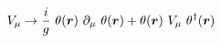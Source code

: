 \begin{equation}
V_\mu \rightarrow \frac{i}{g} ~ \theta(\mbox{\boldmath$r$})~\partial_\mu ~\theta(\mbox{\boldmath$r$}) + \theta(\mbox{\boldmath$r$})~V_\mu~\theta^\dag (\mbox{\boldmath$r$})
\end{equation}

